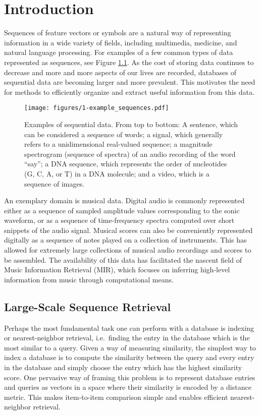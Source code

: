 \chapter{Introduction}

Sequences of feature vectors or symbols are a natural way of representing information in a wide variety of fields, including multimedia, medicine, and natural language processing.
For examples of a few common types of data represented as sequences, see Figure \ref{fig:example_sequences}.
As the cost of storing data continues to decrease and more and more aspects of our lives are recorded, databases of sequential data are becoming larger and more prevalent.
This motivates the need for methods to efficiently organize and extract useful information from this data.

\begin{figure}
  \texttt{[image: figures/1-example\_sequences.pdf]}
  \caption{Examples of sequential data.  From top to bottom: A sentence, which can be considered a sequence of words; a signal, which generally refers to a unidimensional real-valued sequence; a magnitude spectrogram (sequence of spectra) of an audio recording of the word ``say''; a DNA sequence, which represents the order of nucleotides (G, C, A, or T) in a DNA molecule; and a video, which is a sequence of images.}
  \label{fig:example_sequences}
\end{figure}

An exemplary domain is musical data.
Digital audio is commonly represented either as a sequence of sampled amplitude values corresponding to the sonic waveform, or as a sequence of time-frequency spectra computed over short snippets of the audio signal.
Musical scores can also be conveniently represented digitally as a sequence of notes played on a collection of instruments.
This has allowed for extremely large collections of musical audio recordings and scores to be assembled.
The availability of this data has facilitated the nascent field of Music Information Retrieval (MIR), which focuses on inferring high-level information from music through computational means.

\cite{}

\section{Large-Scale Sequence Retrieval}

Perhaps the most fundamental task one can perform with a database is indexing or nearest-neighbor retrieval, i.e.\ finding the entry in the database which is the most similar to a query.
Given a way of measuring similarity, the simplest way to index a database is to compute the similarity between the query and every entry in the database and simply choose the entry which has the highest similarity score.
One pervasive way of framing this problem is to represent database entries and queries as vectors in a space where their similarity is encoded by a distance metric.
This makes item-to-item comparison simple and enables efficient nearest-neighbor retrieval.

